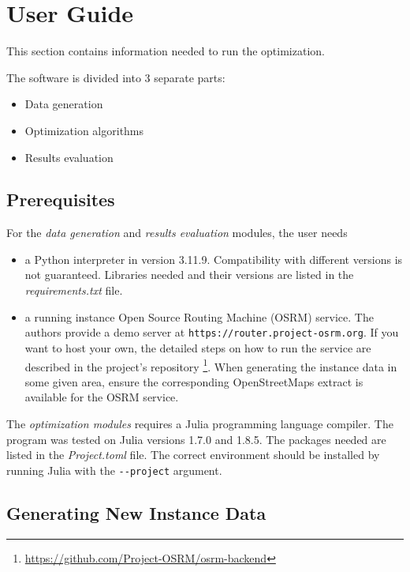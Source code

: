 \chapter{User Guide}

This section contains information needed to run the optimization.

The software is divided into 3 separate parts:

\begin{itemize}
    \setlength\itemsep{0pt}
    \item Data generation
    \item Optimization algorithms
    \item Results evaluation
\end{itemize}

\section{Prerequisites}

For the \textit{data generation} and \textit{results evaluation} modules, the user needs
\begin{itemize}
    \setlength\itemsep{0pt}
    \item a Python interpreter in version 3.11.9. Compatibility with different versions is not guaranteed. Libraries needed and their versions are listed in the \textit{requirements.txt} file. 
    \item a running instance Open Source Routing Machine (OSRM) \cite{luxen-vetter-2011} service. The authors provide a demo server at \texttt{https://router.project-osrm.org}. If you want to host your own, the detailed steps on how to run the service are described in the project's repository \footnote{\url{https://github.com/Project-OSRM/osrm-backend}}. When generating the instance data in some given area, ensure the corresponding OpenStreetMaps extract is available for the OSRM service.
\end{itemize}

The \textit{optimization modules} requires a Julia programming language compiler. The program was tested on Julia versions 1.7.0 and 1.8.5. The packages needed are listed in the \textit{Project.toml} file. The correct environment should be installed by running Julia with the \texttt{-{}-project} argument.

\section{Generating New Instance Data}

